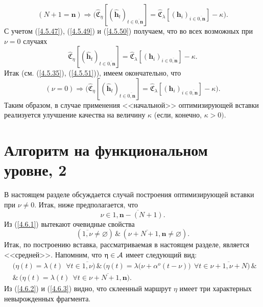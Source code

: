\documentclass[11pt,twoside,openany]{report}
\newcommand{\bfn}{\begin{equation}}
\newcommand{\efn}{\end{equation}}
\newcommand{\ov}{\overline}
\newcommand{\la}{\lambda}
\newcommand{\al}{\alpha}
\newcommand{\fa}{\forall}
\newcommand{\ca}{{\cal A}}
\newcommand{\emp}{\varnothing}
\begin{document}
{{$$
(N+1 = \mathbf{n}) \Longrightarrow \bigl(\widehat{\mathfrak{C}}_\eta[(\hat{\mathbf{h}}_t)_{t\in
\ov{0,\mathbf{n}}}] = \widehat{\mathfrak{C}}_\la[(\mathbf{h}_i)_{i\in\ov{0,\mathbf{n}}}] - \kappa\bigl).
$$
С учетом (\ref{4.5.47}), (\ref{4.5.49}) и (\ref{4.5.50}) получаем, что во всех возможных при $\nu=0$ случаях
\bfn\label{4.5.51}
\widehat{\mathfrak{C}}_\eta[(\hat{\mathbf{h}}_t)_{t\in\ov{0,\mathbf{n}}}] =
\widehat{\mathfrak{C}}_\la[(\mathbf{h}_i)_{i\in\ov{0,\mathbf{n}}}] - \kappa.
\efn
Итак (см. (\ref{4.5.35}), (\ref{4.5.51})), имеем окончательно, что
\bfn\label{4.5.52}(\nu=0) \Longrightarrow \bigl(\widehat{\mathfrak{C}}_\eta[(\hat{\mathbf{h}}_t)_{t\in
\ov{0,\mathbf{n}}}] = \widehat{\mathfrak{C}}_\la[(\mathbf{h}_i)_{i\in\ov{0,\mathbf{n}}}] - \kappa\bigl).
\efn
Таким образом, в случае применения <<начальной>> оптимизирующей вставки реализуется улучшение
качества на величину $\kappa$ (если, конечно, $\kappa >0).$

\section{Алгоритм на функциональном уровне, 2}
\setcounter{equation}{0}

В настоящем разделе обсуждается случай построения оптимизирующей вставки при  $\nu \neq 0.$
Итак, ниже предполагается, что
\bfn\label{4.6.1}\nu\in \ov{1,\mathbf{n}-(N+1)}.
\efn
Из (\ref{4.6.1}) вытекают очевидные свойства
\bfn\label{4.6.2}(\ov{1,\nu}\neq \emp)\,\&\,(\ov{\nu+N+1,\mathbf{n}}\neq \emp).
\efn
Итак, по построению вставка, рассматриваемая в настоящем разделе, является <<средней>>.
Напомним, что $\eta\in \ca$ имеет следующий вид:
\begin{eqnarray}
&\bigl(\eta(t) = \la(t)\ \ \fa t\in \ov{1,\nu}\bigl)\,\&\,\bigl(\eta(t) =
\la(\nu+ \al^o(t-\nu)\bigl)\ \ \fa t\in \ov{\nu+1,\nu+N}\bigl)\,\&
&\nonumber\\
&\&\,\bigl(\eta(t)= \la(t)\ \ \fa t\in \ov{\nu+N+1,\mathbf{n}}\bigl).
&\label{4.6.3}
\end{eqnarray}
Из (\ref{4.6.2}) и (\ref{4.6.3}) видно, что склеенный маршрут $\eta$ имеет три
характерных невырожденных фрагмента.

}}
\end{document}

